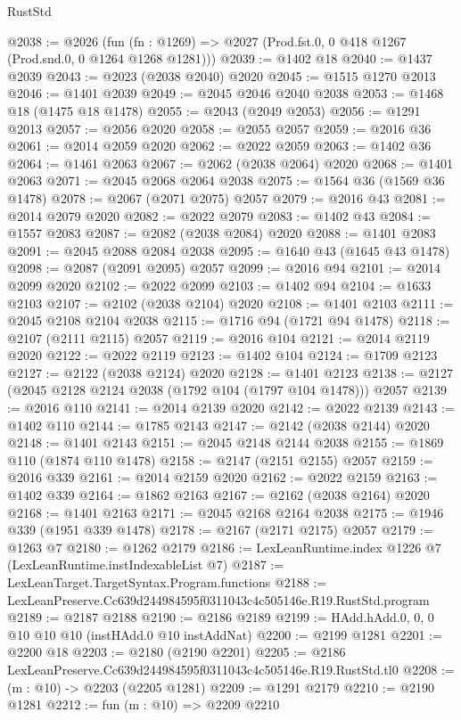 \begin{lexlean}{RustStd}
\begin{coremodule}
@2038 := @2026
    (fun (fn : @1269) => @2027 (Prod.fst.{0, 0} @418 @1267 (Prod.snd.{0, 0} @1264 @1268 @1281)))
@2039 := @1402 @18
@2040 := @1437 @2039
@2043 := @2023 (@2038 @2040) @2020
@2045 := @1515 @1270 @2013
@2046 := @1401 @2039
@2049 := @2045 @2046 @2040 @2038
@2053 := @1468 @18 (@1475 @18 @1478)
@2055 := @2043 (@2049 @2053)
@2056 := @1291 @2013
@2057 := @2056 @2020
@2058 := @2055 @2057
@2059 := @2016 @36
@2061 := @2014 @2059 @2020
@2062 := @2022 @2059
@2063 := @1402 @36
@2064 := @1461 @2063
@2067 := @2062 (@2038 @2064) @2020
@2068 := @1401 @2063
@2071 := @2045 @2068 @2064 @2038
@2075 := @1564 @36 (@1569 @36 @1478)
@2078 := @2067 (@2071 @2075) @2057
@2079 := @2016 @43
@2081 := @2014 @2079 @2020
@2082 := @2022 @2079
@2083 := @1402 @43
@2084 := @1557 @2083
@2087 := @2082 (@2038 @2084) @2020
@2088 := @1401 @2083
@2091 := @2045 @2088 @2084 @2038
@2095 := @1640 @43 (@1645 @43 @1478)
@2098 := @2087 (@2091 @2095) @2057
@2099 := @2016 @94
@2101 := @2014 @2099 @2020
@2102 := @2022 @2099
@2103 := @1402 @94
@2104 := @1633 @2103
@2107 := @2102 (@2038 @2104) @2020
@2108 := @1401 @2103
@2111 := @2045 @2108 @2104 @2038
@2115 := @1716 @94 (@1721 @94 @1478)
@2118 := @2107 (@2111 @2115) @2057
@2119 := @2016 @104
@2121 := @2014 @2119 @2020
@2122 := @2022 @2119
@2123 := @1402 @104
@2124 := @1709 @2123
@2127 := @2122 (@2038 @2124) @2020
@2128 := @1401 @2123
@2138 := @2127 (@2045 @2128 @2124 @2038 (@1792 @104 (@1797 @104 @1478))) @2057
@2139 := @2016 @110
@2141 := @2014 @2139 @2020
@2142 := @2022 @2139
@2143 := @1402 @110
@2144 := @1785 @2143
@2147 := @2142 (@2038 @2144) @2020
@2148 := @1401 @2143
@2151 := @2045 @2148 @2144 @2038
@2155 := @1869 @110 (@1874 @110 @1478)
@2158 := @2147 (@2151 @2155) @2057
@2159 := @2016 @339
@2161 := @2014 @2159 @2020
@2162 := @2022 @2159
@2163 := @1402 @339
@2164 := @1862 @2163
@2167 := @2162 (@2038 @2164) @2020
@2168 := @1401 @2163
@2171 := @2045 @2168 @2164 @2038
@2175 := @1946 @339 (@1951 @339 @1478)
@2178 := @2167 (@2171 @2175) @2057
@2179 := @1263 @7
@2180 := @1262 @2179
@2186 := LexLeanRuntime.index @1226 @7 (LexLeanRuntime.instIndexableList @7)
@2187 := LexLeanTarget.TargetSyntax.Program.functions
@2188 := LexLeanPreserve.Cc639d244984595f0311043c4c505146e.R19.RustStd.program
@2189 := @2187 @2188
@2190 := @2186 @2189
@2199 := HAdd.hAdd.{0, 0, 0} @10 @10 @10 (instHAdd.{0} @10 instAddNat)
@2200 := @2199 @1281
@2201 := @2200 @18
@2203 := @2180 (@2190 @2201)
@2205 := @2186 LexLeanPreserve.Cc639d244984595f0311043c4c505146e.R19.RustStd.tl0
@2208 := (m : @10) -> @2203 (@2205 @1281)
@2209 := @1291 @2179
@2210 := @2190 @1281
@2212 := fun (m : @10) => @2209 @2210

\end{coremodule}
\end{lexlean}
